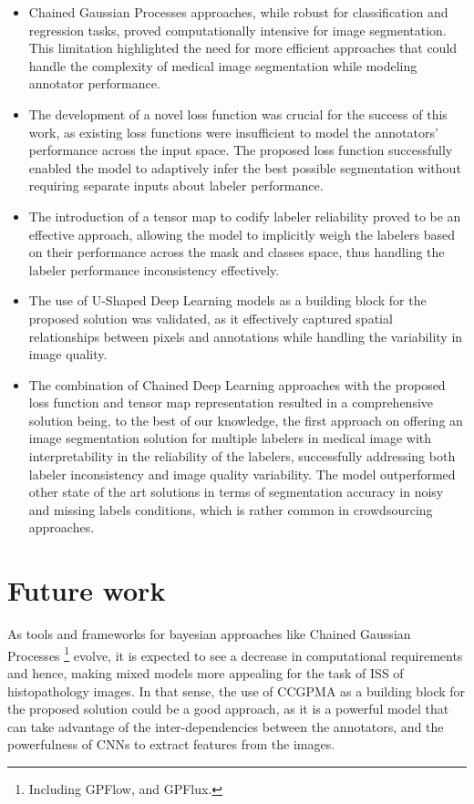 \begin{itemize}
  \item Chained Gaussian Processes approaches, while robust for classification
    and regression tasks, proved computationally intensive for image
    segmentation.
    This limitation highlighted the need for more efficient
    approaches that could
    handle the complexity of medical image segmentation while modeling annotator
    performance.
  \item The development of a novel loss function was crucial for the success
    of this work, as existing loss functions were insufficient to model the
    annotators' performance across the input space. The proposed loss function
    successfully enabled the model to adaptively infer the best possible
    segmentation without requiring separate inputs about labeler performance.
  \item The introduction of a tensor map to codify labeler reliability proved
    to be an effective approach, allowing the model to implicitly weigh the
    labelers based on their performance across the mask and classes space,
    thus handling the labeler performance inconsistency effectively.
  \item The use of U-Shaped Deep Learning models as a building block
    for the proposed solution was validated, as it effectively captured
    spatial relationships between pixels and annotations while handling
    the variability in image quality.
  \item The combination of Chained Deep Learning approaches with the
    proposed loss function and tensor map representation resulted in a
    comprehensive solution being, to the best of our knowledge, the
    first approach on offering an image segmentation solution for
    multiple labelers in medical image with interpretability in the
    reliability of the labelers, successfully addressing both
    labeler inconsistency and image quality variability. The model outperformed
    other state of the art solutions in terms of segmentation
    accuracy in noisy and missing labels conditions, which is rather
    common in crowdsourcing approaches.
\end{itemize}

\section{Future work}

As tools and frameworks for bayesian approaches like Chained Gaussian Processes
\footnote{Including GPFlow, and GPFlux.}
evolve, it is expected to see a decrease in computational
requirements and hence, making mixed models more appealing for the
task of \gls{ISS} of histopathology images.
In that sense, the use of \gls{CCGPMA} as a building block for the
proposed solution could be a good approach, as it is a powerful model
that can take advantage of the inter-dependencies between the annotators,
and the powerfulness of \glspl{CNN} to extract features from the images.

